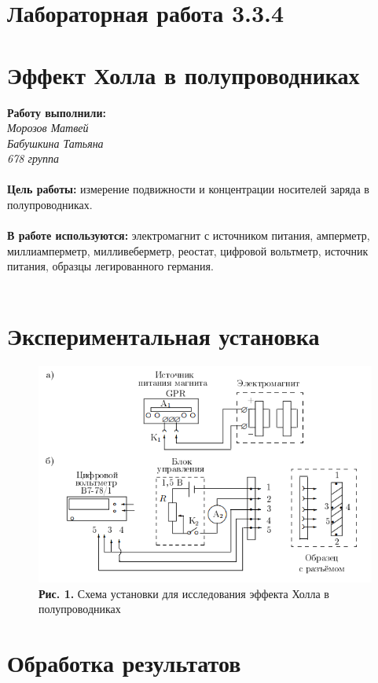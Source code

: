 \documentclass[11pt,a4paper]{article}
\begin{document}
	\part*{Лабораторная работа 3.3.4}
	\part*{Эффект Холла в полупроводниках}
	\textbf{Работу выполнили:} \\
	{\itshape Морозов Матвей \\ Бабушкина Татьяна \\ 678 группа} \\\\
	\textbf{Цель работы:} измерение подвижности и концентрации носителей заряда в полупроводниках.
	\\\\
	\textbf{В работе используются:} электромагнит с источником питания, амперметр, миллиамперметр, милливеберметр, реостат, цифровой вольтметр, источник питания, образцы легированного германия.
	\\\\
	\part*{Экспериментальная установка}
	\begin{figure} [h!]
		\centering
		\includegraphics[width=0.6\linewidth]{6}
		\\
		\textbf {Рис. 1.} Схема установки для исследования эффекта Холла в полупроводниках \\
	\end{figure}
		
	\part*{Обработка результатов}
	
\end{document}
